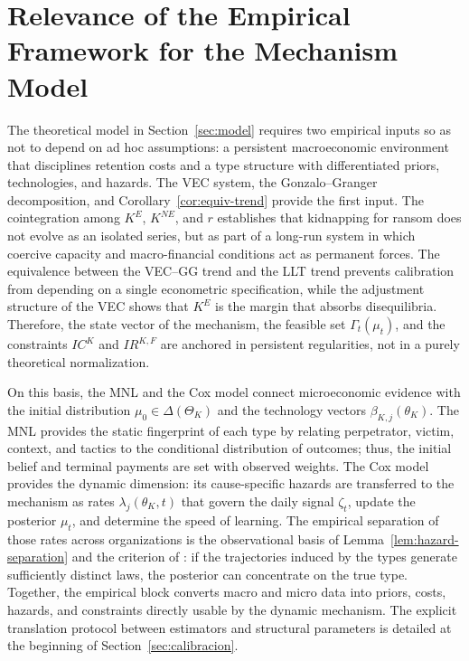 \documentclass[ecta,nameyear,draft]{econsocart}
\theoremstyle{plain}
\theoremstyle{definition}
\newcommand{\ThetaK}{\Theta_K}
\newcommand{\1}{\mathbf{1}}
\begin{document}
\section{Relevance of the Empirical Framework for the Mechanism Model}\label{sec:pertinencia}

The theoretical model in Section~\ref{sec:model} requires two empirical inputs so as not to depend on ad hoc assumptions: a persistent macroeconomic environment that disciplines retention costs and a type structure with differentiated priors, technologies, and hazards. The VEC system, the Gonzalo--Granger decomposition, and Corollary~\ref{cor:equiv-trend} provide the first input. The cointegration among $K^E$, $K^{NE}$, and $r$ establishes that kidnapping for ransom does not evolve as an isolated series, but as part of a long-run system in which coercive capacity and macro-financial conditions act as permanent forces. The equivalence between the VEC--GG trend and the LLT trend prevents calibration from depending on a single econometric specification, while the adjustment structure of the VEC shows that $K^E$ is the margin that absorbs disequilibria. Therefore, the state vector of the mechanism, the feasible set $\Gamma_t(\mu_t)$, and the constraints $IC^K$ and $IR^{K,F}$ are anchored in persistent regularities, not in a purely theoretical normalization.

On this basis, the MNL and the Cox model connect microeconomic evidence with the initial distribution $\mu_0\in\Delta(\ThetaK)$ and the technology vectors $\beta_{K,j}(\theta_K)$. The MNL provides the static fingerprint of each type by relating perpetrator, victim, context, and tactics to the conditional distribution of outcomes; thus, the initial belief and terminal payments are set with observed weights. The Cox model provides the dynamic dimension: its cause-specific hazards are transferred to the mechanism as rates $\lambda_j(\theta_K,t)$ that govern the daily signal $\zeta_t$, update the posterior $\mu_t$, and determine the speed of learning. The empirical separation of those rates across organizations is the observational basis of Lemma~\ref{lem:hazard-separation} and the criterion of \citet{Kakutani1948}: if the trajectories induced by the types generate sufficiently distinct laws, the posterior can concentrate on the true type. Together, the empirical block converts macro and micro data into priors, costs, hazards, and constraints directly usable by the dynamic mechanism. The explicit translation protocol between estimators and structural parameters is detailed at the beginning of Section~\ref{sec:calibracion}.
\end{document}
